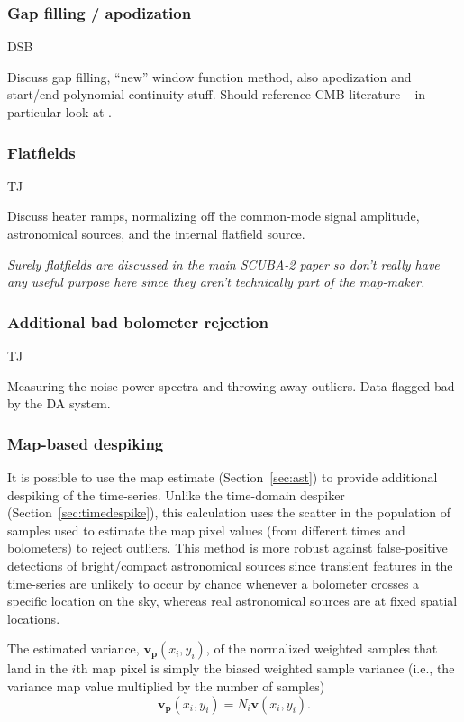 \documentclass[useAMS,usenatbib,nofootinbib]{mn2e}
\begin{document}
\subsubsection{Gap filling / apodization}
\label{sec:gaps}

DSB

Discuss gap filling, ``new'' window function method, also apodization
and start/end polynomial continuity stuff. Should reference CMB
literature -- in particular look at \citet{stompor2002}.

\subsubsection{Flatfields}
\label{sec:flatfields}

TJ

Discuss heater ramps, normalizing off the common-mode signal
amplitude, astronomical sources, and the internal flatfield source.

\textit{Surely flatfields are discussed in the main SCUBA-2 paper so
don't really have any useful purpose here since they aren't
technically part of the map-maker.}

\subsubsection{Additional bad bolometer rejection}

TJ

Measuring the noise power spectra and throwing away outliers. Data
flagged bad by the DA system.

\subsubsection{Map-based despiking}
\label{sec:mapdespike}

It is possible to use the map estimate (Section~\ref{sec:ast}) to
provide additional despiking of the time-series. Unlike the
time-domain despiker (Section~\ref{sec:timedespike}), this calculation
uses the scatter in the population of samples used to estimate the map
pixel values (from different times and bolometers) to reject
outliers. This method is more robust against false-positive detections
of bright/compact astronomical sources since transient features in the
time-series are unlikely to occur by chance whenever a bolometer
crosses a specific location on the sky, whereas real astronomical
sources are at fixed spatial locations.

The estimated variance, $\mathbf{v_p}(x_i,y_i)$, of the normalized
weighted samples that land in the $i$th map pixel is simply the biased
weighted sample variance (i.e., the variance map value multiplied by
the number of samples)
%
\begin{equation}
  \mathbf{v_p}(x_i,y_i) = N_i \mathbf{v}(x_i,y_i).
\end{equation}
\end{document}
